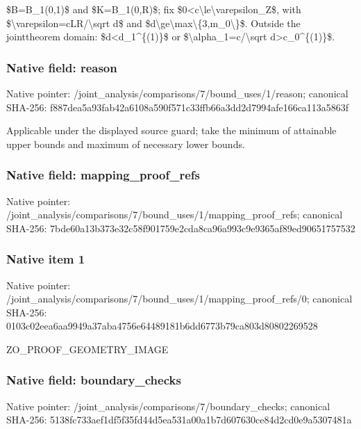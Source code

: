 \documentclass[10pt,a4paper]{article}
\begin{document}
\$B=B\_1(0,1)\$ and \$K=B\_1(0,R)\$; fix \$0<c\textbackslash{}le\textbackslash{}varepsilon\_Z\$, with \$\textbackslash{}varepsilon=cLR/\textbackslash{}sqrt d\$ and \$d\textbackslash{}ge\textbackslash{}max\textbackslash{}\{3,m\_0\textbackslash{}\}\$. Outside the jointtheorem domain: \$d<d\_1\textasciicircum{}\{(1)\}\$ or \$\textbackslash{}alpha\_1=c/\textbackslash{}sqrt d>c\_0\textasciicircum{}\{(1)\}\$.


\subsubsection{Native field: reason}


Native pointer: /joint\_analysis/comparis\allowbreak{}ons/7/bound\_uses/1/reaso\allowbreak{}n; canonical SHA-256: f887dea5a93fab42a6108a59\allowbreak{}0f571c33ffb66a3dd2d7994a\allowbreak{}fe166ca113a5863f


Applicable under the displayed source guard; take the minimum of attainable upper bounds and maximum of necessary lower bounds.


\subsubsection{Native field: mapping\_proof\_refs}


Native pointer: /joint\_analysis/comparis\allowbreak{}ons/7/bound\_uses/1/mappi\allowbreak{}ng\_proof\_refs; canonical SHA-256: 7bde60a13b373e32c58f9017\allowbreak{}59e2cda8ca96a993c9e9365a\allowbreak{}f89ed90651757532



\subsubsection{Native item 1}


Native pointer: /joint\_analysis/comparis\allowbreak{}ons/7/bound\_uses/1/mappi\allowbreak{}ng\_proof\_refs/0; canonical SHA-256: 0103c02eea6aa9949a37aba4\allowbreak{}756e64489181b6dd6773b79c\allowbreak{}a803d80802269528


ZO\_PROOF\_GEOMETRY\_IMAGE


\subsubsection{Native field: boundary\_checks}


Native pointer: /joint\_analysis/comparis\allowbreak{}ons/7/boundary\_checks; canonical SHA-256: 5138fc733aef1df5f35fd44d\allowbreak{}5ea531a00a1b7d607630ce84\allowbreak{}d2cd0e9a5307481a
\end{document}
